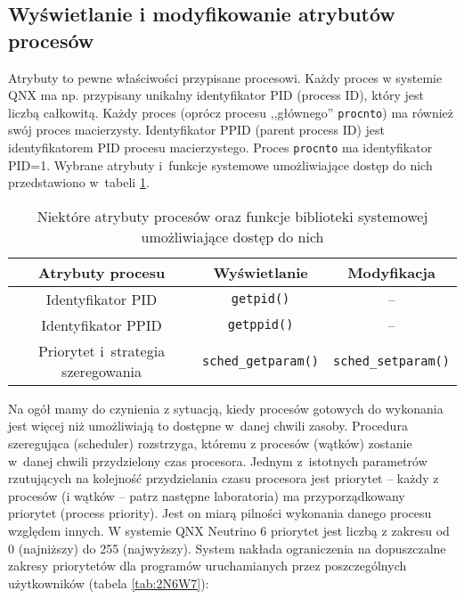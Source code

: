 \subsection{Wyświetlanie i modyfikowanie atrybutów procesów}

Atrybuty to pewne właściwości przypisane procesowi. Każdy proces w systemie QNX
ma np. przypisany unikalny identyfikator PID (process ID), który jest liczbą
całkowitą. Każdy proces (oprócz procesu ,,głównego'' \texttt{procnto}) ma
również swój proces macierzysty. Identyfikator PPID (parent process ID) jest
identyfikatorem PID procesu macierzystego. Proces \texttt{procnto} ma
identyfikator PID=1. Wybrane atrybuty i~funkcje systemowe umożliwiające dostęp
do nich przedstawiono w~tabeli \ref{tab:HE6LE}.

\begin{table}[h!]
  \centering
  \caption{Niektóre atrybuty procesów oraz funkcje biblioteki systemowej
           umożliwiające dostęp do nich}
  \label{tab:HE6LE}
  \begin{tabular}{|c|c|c|}
    \hline
    \textbf{Atrybuty procesu} & \textbf{Wyświetlanie} & \textbf{Modyfikacja} \\ \hline
    Identyfikator PID                   & \texttt{getpid()}           & -- \\ \hline
    Identyfikator PPID                  & \texttt{getppid()}          & -- \\ \hline
    Priorytet i~strategia szeregowania  & \texttt{sched\_getparam()}  & \texttt{sched\_setparam()} \\ \hline
  \end{tabular}
\end{table}

Na ogół mamy do czynienia z sytuacją, kiedy procesów gotowych do wykonania jest
więcej niż umożliwiają to dostępne w~danej chwili zasoby. Procedura szeregująca
(scheduler) rozstrzyga, któremu z procesów (wątków) zostanie w~danej chwili
przydzielony czas procesora. Jednym z~istotnych parametrów rzutujących na
kolejność przydzielania czasu procesora jest priorytet -- każdy z procesów (i
wątków -- patrz następne laboratoria) ma przyporządkowany priorytet (process
priority).  Jest on miarą pilności wykonania danego procesu względem innych.
W systemie QNX Neutrino 6 priorytet jest liczbą z zakresu od 0 (najniższy) do
255 (najwyższy). System nakłada ograniczenia na dopuszczalne zakresy
priorytetów dla programów uruchamianych przez poszczególnych użytkowników
(tabela \ref{tab:2N6W7}):

